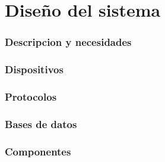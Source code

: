 \chapter{Diseño del sistema}
\label{chap:disenosistema}
\subsection{Descripcion y necesidades}
\subsection{Dispositivos}
\subsection{Protocolos}
\subsection{Bases de datos}
\subsection{Componentes}

